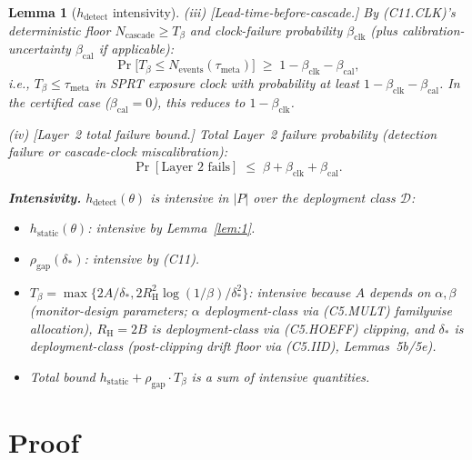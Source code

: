 \documentclass{article}
\newtheorem{lemma}{Lemma}
\newcommand{\deltastar}{\delta_{*}}
\newcommand{\rhogap}{\rho_{\mathrm{gap}}}
\newcommand{\Tbeta}{T_{\beta}}
\newcommand{\Ncasc}{N_{\mathrm{cascade}}}
\newcommand{\Nev}{N_{\mathrm{events}}}
\newcommand{\bclk}{\beta_{\mathrm{clk}}}
\newcommand{\bcal}{\beta_{\mathrm{cal}}}
\newcommand{\Bclip}{B}
\newcommand{\Rh}{R_{\mathrm{H}}}
\begin{document}
\begin{lemma}[$h_{\mathrm{detect}}$ intensivity]
(iii) [Lead-time-before-cascade.]  By (C11.CLK)'s deterministic
floor $\Ncasc \geq \Tbeta$ and clock-failure probability $\bclk$
(plus calibration-uncertainty $\bcal$ if applicable):
\[
  \Pr\bigl[\Tbeta \leq \Nev(\tau_{\mathrm{meta}})\bigr] \;\geq\; 1 -
  \bclk - \bcal,
\]
i.e., $\Tbeta \leq \tau_{\mathrm{meta}}$ in SPRT exposure clock
with probability at least $1 - \bclk - \bcal$.  In the certified
case ($\bcal = 0$), this reduces to $1 - \bclk$.

(iv) [Layer~2 total failure bound.]  Total Layer~2 failure
probability (detection failure or cascade-clock miscalibration):
\[
  \Pr[\text{Layer~2 fails}] \;\leq\; \beta + \bclk + \bcal.
\]

\textbf{Intensivity.}  $h_{\mathrm{detect}}(\theta)$ is intensive
in $|P|$ over the deployment class $\mathcal{D}$:
\begin{itemize}
\item $h_{\mathrm{static}}(\theta)$: intensive by Lemma~\ref{lem:1}.
\item $\rhogap(\deltastar)$: intensive by (C11).
\item $\Tbeta = \max\{2A/\deltastar, 2\Rh^2\log(1/\beta)/\deltastar^2\}$:
  intensive because $A$ depends on $\alpha, \beta$ (monitor-design
  parameters; $\alpha$ deployment-class via (C5.MULT) familywise
  allocation), $\Rh = 2\Bclip$ is deployment-class via (C5.HOEFF)
  clipping, and $\deltastar$ is deployment-class (post-clipping
  drift floor via (C5.IID), Lemmas~5b/5e).
\item Total bound $h_{\mathrm{static}} + \rhogap \cdot \Tbeta$ is
  a sum of intensive quantities.
\end{itemize}
\end{lemma}

\section{Proof}
\end{document}
